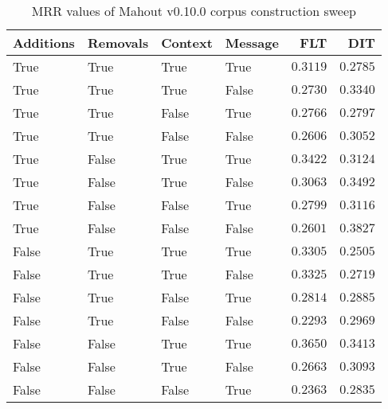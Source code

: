 
\begin{table}
\begin{spacing}{1.2}
\centering
\caption{MRR values of Mahout v0.10.0 corpus construction sweep}
\label{table:mahout_corpus_sweep}
\vspace{0.2em}
\begin{tabular}{llll|rr}
\toprule
Additions & Removals & Context & Message & FLT &        DIT \\
\midrule
     True &     True &    True &    True &         $0.3119$ &      $0.2785$ \\
     \myrowcolor True &     True &    True &   False &         $0.2730$ &      $0.3340$ \\
     True &     True &   False &    True &         $0.2766$ &      $0.2797$ \\
     True &     True &   False &   False &         $0.2606$ &      $0.3052$ \\
     True &    False &    True &    True &         $0.3422$ &      $0.3124$ \\
     True &    False &    True &   False &         $0.3063$ &      $0.3492$ \\
     True &    False &   False &    True &         $0.2799$ &      $0.3116$ \\
     True &    False &   False &   False &         $0.2601$ & $\bm{0.3827}$ \\
    False &     True &    True &    True &         $0.3305$ &      $0.2505$ \\
    False &     True &    True &   False &         $0.3325$ &      $0.2719$ \\
    False &     True &   False &    True &         $0.2814$ &      $0.2885$ \\
    False &     True &   False &   False &         $0.2293$ &      $0.2969$ \\
    False &    False &    True &    True &    $\bm{0.3650}$ &      $0.3413$ \\
    False &    False &    True &   False &         $0.2663$ &      $0.3093$ \\
    False &    False &   False &    True &         $0.2363$ &      $0.2835$ \\
\bottomrule
\end{tabular}

\end{spacing}
\end{table}
